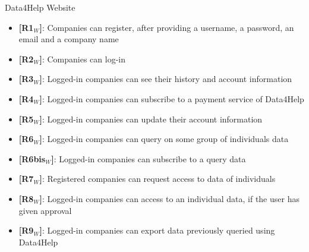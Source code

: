 \noindent Data4Help Website
\begin{itemize}
    \item \textbf{[R1$_W$]}: Companies can register, after providing a username, a password, an email and a company name
    \item \textbf{[R2$_W$]}: Companies can log-in
    \item \textbf{[R3$_W$]}: Logged-in companies can see their history and account information
    \item \textbf{[R4$_W$]}: Logged-in companies can subscribe to a payment service of Data4Help
    \item \textbf{[R5$_W$]}: Logged-in companies can update their account information
    \item \textbf{[R6$_W$]}: Logged-in companies can query on some group of individuals data
    \item \textbf{[R6bis$_W$]}: Logged-in companies can subscribe to a query data
    \item \textbf{[R7$_W$]}: Registered companies can request access to data of individuals
    \item \textbf{[R8$_W$]}: Logged-in companies can access to an individual data, if the user has given approval
    \item \textbf{[R9$_W$]}: Logged-in companies can export data previously queried using Data4Help
    
\end{itemize}

